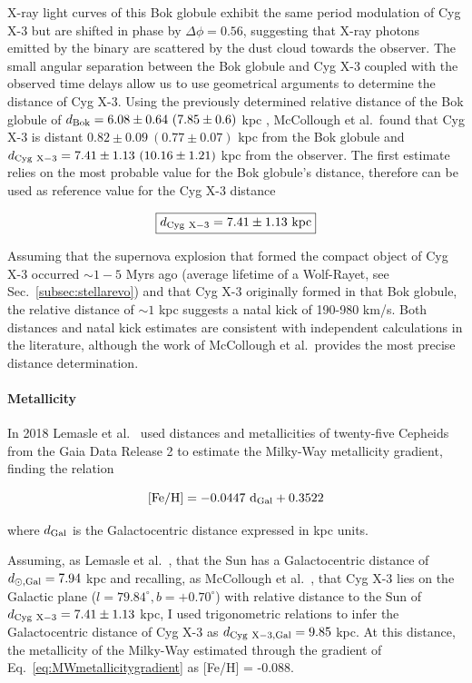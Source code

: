 \documentclass[a4paper,titlepage]{book}     	%
\begin{document}
X-ray light curves of this Bok globule exhibit the same period modulation of Cyg X-3 but are shifted in phase by $\Delta \phi = 0.56$, suggesting that X-ray photons emitted by the binary are scattered by the dust cloud towards the observer. The small angular separation between the Bok globule and Cyg X-3 coupled with the observed time delays allow us to use geometrical arguments to determine the distance of Cyg X-3. Using the previously determined relative distance of the Bok globule of $d_{\rm Bok} = 6.08 \pm 0.64~ (7.85 \pm 0.6)$ kpc , McCollough et al.\ found that Cyg X-3 is distant $0.82 \pm 0.09~ (0.77 \pm 0.07)$ kpc from the Bok globule and $d_{\rm Cyg~X-3} = 7.41 \pm 1.13~ (10.16 \pm 1.21)$ kpc from the observer. The first estimate relies on the most probable value for the Bok globule's distance, therefore can be used as reference value for the Cyg X-3 distance

\begin{equation}\label{eq:distanceCygX3}
    \boxed{d_{\rm Cyg~X-3} = 7.41 \pm 1.13 ~\rm kpc}
\end{equation}



Assuming that the supernova explosion that formed the compact object of Cyg X-3 occurred $\sim 1-5$ Myrs ago (average lifetime of a Wolf-Rayet, see Sec.\ \ref{subsec:stellarevo}) and that Cyg X-3 originally formed in that Bok globule, the relative distance of $\sim 1$ kpc suggests a natal kick of 190-980 km/s. Both distances and natal kick estimates are consistent with independent calculations in the literature, although the work of McCollough et al.\ provides the most precise distance determination.

\paragraph{Metallicity}
In 2018 Lemasle et al.\ \cite{MetallicityGradientMW2018Gaia} used distances and metallicities of twenty-five Cepheids from the Gaia Data Release 2 to estimate the Milky-Way metallicity gradient, finding the relation

\begin{equation}\label{eq:MWmetallicitygradient}
    [\rm Fe/H]=-0.0447~d_{\rm Gal} + 0.3522
\end{equation}

where $d_{\rm Gal}$ is the Galactocentric distance expressed in kpc units.

Assuming, as Lemasle et al.\ \cite{MetallicityGradientMW2018Gaia}, that the Sun has a Galactocentric distance of $d_{\rm \odot,Gal} = 7.94$ kpc and recalling, as McCollough et al.\ \cite{CygX-3_McCollough2016_Observation}, that Cyg X-3 lies on the Galactic plane ($l=79.84^\circ, b=+0.70^\circ$) with relative distance to the Sun of $d_{\rm Cyg~X-3} = 7.41 \pm 1.13$ kpc, I used trigonometric relations to infer the Galactocentric distance of Cyg X-3 as $d_{\rm Cyg~X-3, Gal} = 9.85$ kpc. At this distance, the metallicity of the Milky-Way estimated through the gradient of Eq.\ \ref{eq:MWmetallicitygradient} as [Fe/H] = -0.088. 
\end{document}
